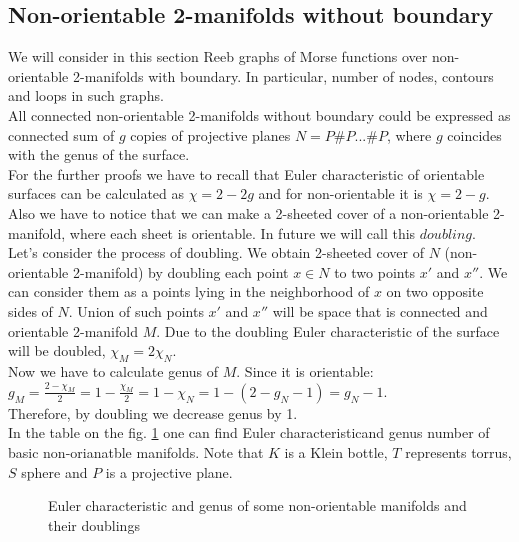 \documentclass[]{article}
\begin{document}

\subsection{Non-orientable 2-manifolds without boundary}

We will consider in this section Reeb graphs of Morse functions over non-orientable 2-manifolds with boundary. In particular, number of nodes, contours and loops in such graphs. \\
All connected non-orientable 2-manifolds without boundary could be expressed as connected sum of  $g$ copies of projective planes $N=P\# P...\# P$, where $g$ coincides with the genus of the surface.\\
For the further proofs we have to recall that Euler characteristic of orientable surfaces can be calculated as $\chi=2-2g$ and for non-orientable it is $\chi=2-g$. Also we have to notice that we can make a 2-sheeted cover of a non-orientable 2-manifold, where each sheet is orientable. In future we will call this $doubling$. \\
Let's consider the process of doubling. We obtain 2-sheeted cover of $N$ (non-orientable 2-manifold) by doubling each point $x\in N$ to two points $x'$ and $x''$. We can consider them as a points lying in the neighborhood of $x$ on two opposite sides of $N$. Union of such points $x'$ and $x''$ will be space that is connected and orientable 2-manifold $M$. Due to the doubling Euler characteristic of the surface will be doubled, $\chi_M=2\chi_N$. \\
Now we have to calculate genus of $M$. Since it is orientable:\\ $g_M=\frac{2-\chi_M}{2}=1-\frac{\chi_M}{2}=1-\chi_N=1-(2-g_N-1)=g_N-1$. \\
Therefore, by doubling we decrease genus by 1. \\
In the table on the fig. \ref{fig:Table} one can find Euler characteristicand genus number of basic non-orianatble manifolds. Note that $K$ is a Klein bottle, $T$ represents torrus,$S$ sphere and $P$ is a projective plane. 
\begin{figure}[h!]
\caption{Euler characteristic and genus of some non-orientable manifolds and their doublings}
\label{fig:Table}
\end{figure}
\end{document}
